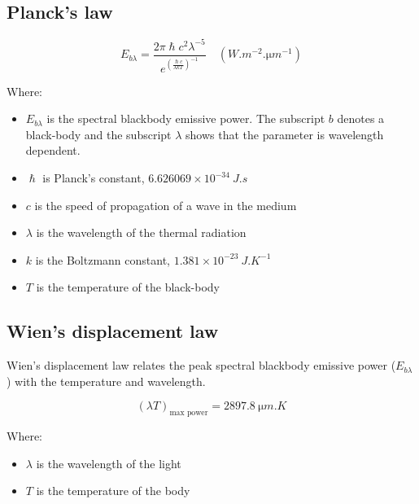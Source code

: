 \documentclass[11pt]{article}
\begin{document}
 \newpage
\subsection{Planck's law}
\label{sec:org677ca16}
\[E_{b \lambda} = \frac{2 \pi \hslash c^2 \lambda^{-5}}{e^{\left(\frac{\hslash c}{\lambda k T} \right)^{-1}}} \quad (\unit{W.m^{-2}.\micro m^{-1}})\]

Where:
\begin{itemize}
\item \(E_{b \lambda}\) is the spectral blackbody emissive power. The subscript \(b\) denotes a black-body and the subscript \(\lambda\) shows that the parameter is wavelength dependent.
\item \(\hslash\) is Planck's constant, \(6.626069 \times 10^{-34} \ \unit{J.s}\)
\item \(c\) is the speed of propagation of a wave in the medium
\item \(\lambda\) is the wavelength of the thermal radiation
\item \(k\) is the Boltzmann constant, \(1.381 \times 10^{-23} \ \unit{J.K^{-1}}\)
\item \(T\) is the temperature of the black-body
\end{itemize}
\subsection{Wien's displacement law}
\label{sec:org62d44f6}
Wien's displacement law relates the peak spectral blackbody emissive power (\(E_{b \lambda}\)) with the temperature and wavelength.

\[(\lambda T)_{\text{max power}} = \qty{2897.8}{\micro m.K}\]

Where:
\begin{itemize}
\item \(\lambda\) is the wavelength of the light
\item \(T\) is the temperature of the body
\end{itemize}
\end{document}

